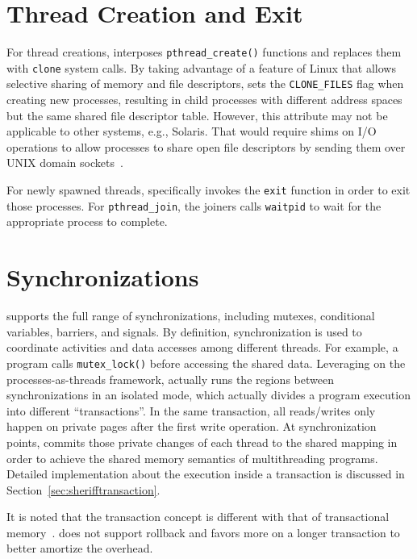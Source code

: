 \section{Thread Creation and Exit}

For thread creations, \sheriff{} interposes \texttt{pthread\_create()} functions and replaces them with \texttt{clone} system calls. 
By taking advantage of a feature of Linux that allows
selective sharing of memory and file descriptors, \sheriff{}
sets the \texttt{CLONE\_FILES} flag when creating new processes, resulting in child processes with different address spaces but the same shared file descriptor table. However, this attribute may not be applicable to other systems, e.g., Solaris. That would require shims on I/O operations to allow processes to share open file descriptors by sending
them over UNIX domain sockets~\cite[Section 17.4]{unixprogramming}.

For newly spawned threads, \sheriff{} specifically invokes the \texttt{exit} function in order to exit those processes. For \texttt{pthread\_join}, the joiners  calls \texttt{waitpid} to wait for the appropriate process to complete.  

\section{Synchronizations}
\label{sec:sheriffsync}

\sheriff{} supports the full range of synchronizations, including mutexes, conditional variables, barriers, and signals. By definition, synchronization is used to coordinate activities and data accesses among different threads. For example, a program calls \texttt{mutex\_lock()} before accessing the shared data. Leveraging on the processes-as-threads framework, \sheriff{} actually runs the regions between synchronizations in an isolated mode, which actually divides a program execution into different ``transactions''. In the same transaction, all reads/writes only happen on private pages after the first write operation.  At synchronization points, \sheriff{} commits those private changes of each thread to the shared mapping in order to achieve the shared memory semantics of multithreading programs. Detailed implementation about the execution inside a transaction is discussed in Section~\ref{sec:sherifftransaction}. 

It is noted that the transaction concept is different with that of transactional memory~\cite{transaction}. \sheriff{} does not support rollback and favors more on a longer transaction to better amortize the overhead. 

